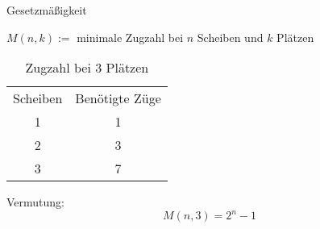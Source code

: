 \begin{frame}{Gesetzmäßigkeit}
    \begin{definition}
    $M(n,k) := $ minimale Zugzahl bei $n$ Scheiben und $k$ Plätzen
    \end{definition}
    \begin{table}[h]
        \centering
        \begin{tabular}{c|c}
            Scheiben & Benötigte Züge \\
            1 & 1 \\
            2 & 3 \\
            3 & 7 \\
        \end{tabular}
        \caption{Zugzahl bei 3 Plätzen}
        \label{tab:3f}
    \end{table}
    \begin{alertblock}{Vermutung:}
    \[M(n,3) = 2^n-1\]
    \end{alertblock}
\end{frame}